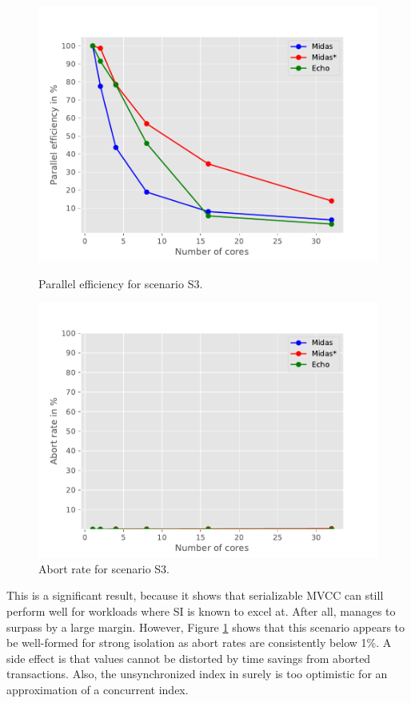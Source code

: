 \begin{figure}[h!]
\begin{minipage}[l]{0.50\textwidth}
    \includegraphics[width=\textwidth]{figures/bench/eff-ls}
    \caption{Parallel efficiency for scenario S3.}
    \label{fig:eff-s3}
\end{minipage}
\begin{minipage}[l]{0.50\textwidth}
    \includegraphics[width=\textwidth]{figures/bench/ar-ls}
    \caption{Abort rate for scenario S3.}
    \label{fig:ar-s3}
\end{minipage}
\end{figure}

This is a significant result, because it shows that serializable MVCC can still
perform well for workloads where SI is known to excel at. After all, \midasopt
manages to surpass \echo by a large margin. However, Figure \ref{fig:ar-s3}
shows that this scenario appears to be well-formed for strong isolation as
abort rates are consistently below 1\%. A side effect is that \ttp values cannot
be distorted by time savings from aborted transactions. Also, the unsynchronized
index in \midasopt surely is too optimistic for an approximation of a concurrent
index.

